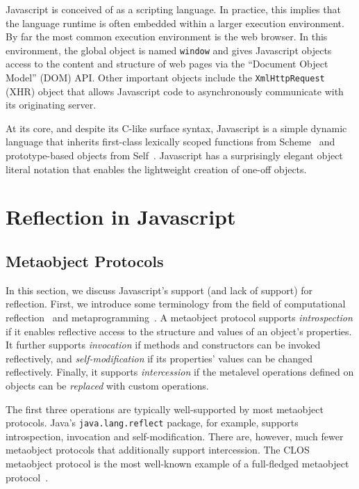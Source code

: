 \documentclass{acm_proc_article-sp}
\begin{document}
Javascript is conceived of as a scripting language. In practice, this implies that the language runtime is often embedded within a larger execution environment. By far the most common execution environment is the web browser. In this environment, the global object is named \texttt{window} and gives Javascript objects access to the content and structure of web pages via the ``Document Object Model'' (DOM) API. Other important objects include the \texttt{XmlHttpRequest} (XHR) object that allows Javascript code to asynchronously communicate with its originating server.

At its core, and despite its C-like surface syntax, Javascript is a simple dynamic language that inherits first-class lexically scoped functions from Scheme~\cite{scheme} and prototype-based objects from Self~\cite{self}. Javascript has a surprisingly elegant object literal notation that enables the lightweight creation of one-off objects.

\section{Reflection in Javascript}

\subsection{Metaobject Protocols}
In this section, we discuss Javascript's support (and lack of support) for reflection. First, we introduce some terminology from the field of computational reflection~\cite{maes-oopsla87} and metaprogramming~\cite{kiczales-artofthemop}. A metaobject protocol supports \emph{introspection} if it enables reflective access to the structure and values of an object's properties. It further supports \emph{invocation} if methods and constructors can be invoked reflectively, and \emph{self-modification} if its properties' values can be changed reflectively. Finally, it supports \emph{intercession} if the metalevel operations defined on objects can be \emph{replaced} with custom operations.

The first three operations are typically well-supported by most metaobject protocols. Java's \texttt{java.lang.reflect} package, for example, supports introspection, invocation and self-modification. There are, however, much fewer metaobject protocols that additionally support intercession. The CLOS metaobject protocol is the most well-known example of a full-fledged metaobject protocol~\cite{clos}.
\end{document}
